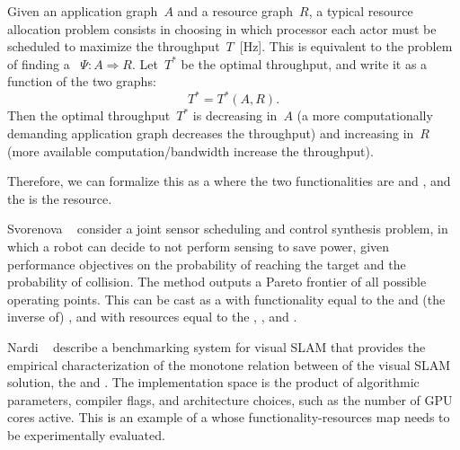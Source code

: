 Given an application graph~$A$ and a resource graph~$R$, a typical resource allocation problem consists in choosing in which processor each actor must be scheduled to maximize the throughput~$T$~[Hz].
This is equivalent to the problem of finding a ~$\Psi \colon A \Rightarrow R$.
Let~$T^{\ast}$ be the optimal throughput, and write it as a function of the two graphs:
\begin{equation}
    T^{\ast}=T^{\ast}(A,R).
\end{equation}
Then the optimal throughput~$T^{\ast}$ is decreasing in~$A$ (a more computationally demanding application graph decreases the throughput) and increasing in~$R$ (more available computation/bandwidth increase the throughput).

Therefore, we can formalize this as a  where the two functionalities are  and , and the  is the resource.

\begin{figure*}[h!]
    \centering
    \caption{}
\end{figure*}

\begin{example}
    Svorenova\,\,\etal~\cite{svorenova16resource} consider a joint sensor scheduling and control synthesis problem, in which a robot can decide to not perform sensing to save power, given performance objectives on the probability of reaching the target and the probability of collision.
    The method outputs a Pareto frontier of all possible operating points.
    This can be cast as a  with functionality equal to the  and (the inverse of) , and with resources equal to the
    , , and .
\end{example}

\begin{figure}[h!]
    \centering
    \caption{}
    \label{fig:progressive-1-1}
\end{figure}

\begin{example}
    Nardi\,\,\etal~\cite{zia16comparative} describe a benchmarking system for visual SLAM that provides the empirical characterization of the monotone relation between  of the visual SLAM solution, the  and .
    The implementation space is the product of algorithmic parameters, compiler flags, and architecture choices, such as the number of GPU cores active.
    This is an example of a  whose functionality-resources map needs to be experimentally evaluated.
\end{example}

